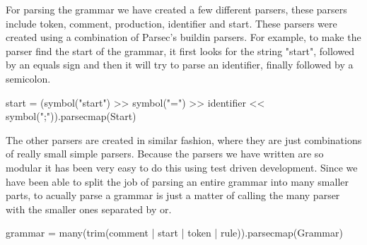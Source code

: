 For parsing the grammar we have created a few different parsers, these parsers include token, comment, production, identifier and start. These parsers were created using a combination of Parsec's buildin parsers. For example, to make the parser find the start of the grammar, it first looks for the string "start", followed by an equals sign and then it will try to parse an identifier, finally followed by a semicolon.
\begin{python}
start = (symbol("start") >> symbol("=") >> identifier
    << symbol(";")).parsecmap(Start)
\end{python}
The other parsers are created in similar fashion, where they are just combinations of really small simple parsers. Because the parsers we have written are so modular it has been very easy to do this using test driven development. Since we have been able to split the job of parsing an entire grammar into many smaller parts, to acually parse a grammar is just a matter of calling the many parser with the smaller ones separated by or.
\begin{python}
grammar = many(trim(comment | start | token | rule)).parsecmap(Grammar)
\end{python}

